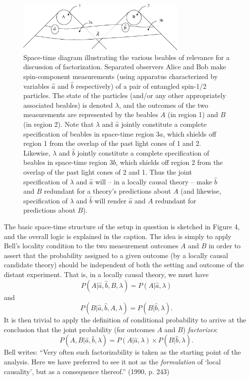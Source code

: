 \documentclass[12pt]{article}
\begin{document}
\begin{figure}[t]
\begin{center}
\includegraphics[width=3.3in,clip]{./fig5.eps}
\end{center}
\caption{
\label{fig5}
Space-time diagram illustrating the various beables of  relevance for
a discussion of factorization.  Separated observers Alice and Bob make
spin-component measurements (using apparatus characterized by
variables $\hat{a}$ and  $\hat{b}$
respectively) of a pair of entangled spin-1/2 particles.   The state
of the particles (and/or any other appropriately associated beables) is denoted
$\lambda$, and the outcomes of the two measurements are represented by
the beables $A$ (in region 1) and $B$ (in region 2).  Note that
$\lambda$ and $\hat{a}$ jointly constitute a complete
specification of beables in space-time region $3a$, which shields off
region 1 from the overlap of the past light cones of 1 and 2.
Likewise, $\lambda$ and $\hat{b}$ jointly constitute a complete
specification of beables in space-time region $3b$, which shields off
region 2 from the overlap of the past light cones of 2 and 1.   Thus
the joint specification of $\lambda$ and $\hat{a}$ will -- in a
locally causal theory -- make $\hat{b}$ and $B$ redundant for a 
theory's predictions about $A$ (and likewise, specification of
$\lambda$ and $\hat{b}$ will render $\hat{a}$ and $A$ redundant
for predictions about $B$).
}
\end{figure}


The basic space-time structure of the setup in question is sketched in
Figure 4, and the overall logic is explained in the caption.  The idea 
is simply to apply Bell's locality condition to the two measurement
outcomes $A$ and $B$ in order to assert that the probability assigned
to a given outcome (by a locally causal candidate theory) should be
independent of both the setting and outcome of the distant
experiment.  That is, in a locally causal theory, we must have
\begin{equation}
P(A | \hat{a}, \hat{b}, B, \lambda) = P(A | \hat{a}, \lambda)
\label{eq:BLA}
\end{equation}
and
\begin{equation}
P(B | \hat{a}, \hat{b}, A, \lambda) = P(B | \hat{b}, \lambda). 
\label{eq:BLB}
\end{equation}
It is then trivial to apply the definition of conditional probability
to arrive at the conclusion that the joint probability (for outcomes
$A$ and $B$) \emph{factorizes}:
\begin{equation}
P(A,B | \hat{a},\hat{b}, \lambda) = P(A|\hat{a},\lambda) \times
P(B|\hat{b},\lambda).
\label{eq:factor}
\end{equation}
Bell writes:  ``Very often such
factorizability is taken as the starting point of the analysis.  Here
we have preferred to see it not as the \emph{formulation} of `local
causality', but as a consequence thereof.'' (1990, p. 243)
\end{document}
